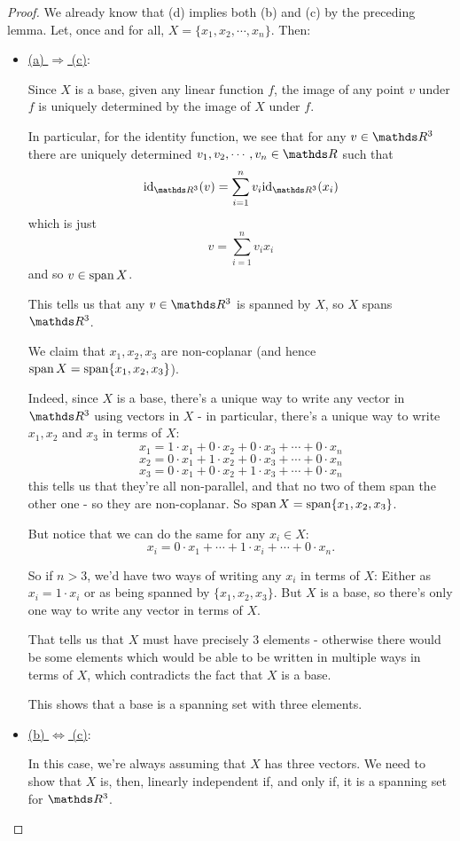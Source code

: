 \begin{proof}
	We already know that (d) implies both (b) and (c) by the preceding lemma. Let, once and for all, $X=\{x_1,x_2,\cdots,x_n\}$. Then:
	\begin{itemize}
		\item \underline{(a) $\Rightarrow$ (c)}:
		
		Since $X$ is a base, given any linear function $f$, the image of any point $v$ under $f$ is uniquely determined by the image of $X$ under $f$.
		
		In particular, for the identity function, we see that for any $v\in\R^3$ there are uniquely determined $v_1,v_2,\cdots,v_n\in\R$ such that
		\[\id_{\R^3}(v)=\sum_{i=1}^nv_i\id_{\R^3}(x_i)\]which is just
		\[v=\sum_{i=1}^nv_ix_i\]and so $v\in \operatorname{span} X$.
		
		This tells us that any $v\in\R^3$ is spanned by $X$, so $X$ spans $\R^3$.
		
		We claim that $x_1,x_2,x_3$ are non-coplanar (and hence $\operatorname{span} X=\operatorname{span} \{x_1,x_2,x_3\}$).
		
		Indeed, since $X$ is a base, there's a unique way to write any vector in $\R^3$ using vectors in $X$ - in particular, there's a unique way to write $x_1,x_2$ and $x_3$ in terms of $X$:
		\[x_1=1\cdot x_1+0\cdot x_2+0\cdot x_3+\cdots+0\cdot x_n\]
		\[x_2=0\cdot x_1+1\cdot x_2+0\cdot x_3+\cdots+0\cdot x_n\]
		\[x_3=0\cdot x_1+0\cdot x_2+1\cdot x_3+\cdots+0\cdot x_n\]this tells us that they're all non-parallel, and that no two of them span the other one - so they are non-coplanar. So $\operatorname{span} X=\operatorname{span} \{x_1,x_2,x_3\}$.
		
		But notice that we can do the same for any $x_i\in X$:
		\[x_i=0\cdot x_1+\cdots+1\cdot x_i+\cdots+0\cdot x_n.\]
		
		So if $n>3$, we'd have two ways of writing any $x_i$ in terms of $X$: Either as $x_i=1\cdot x_i$ or as being spanned by $\{x_1,x_2,x_3\}$. But $X$ is a base, so there's only one way to write any vector in terms of $X$.
		
		That tells us that $X$ must have precisely $3$ elements - otherwise there would be some elements which would be able to be written in multiple ways in terms of $X$, which contradicts the fact that $X$ is a base.
		
		This shows that a base is a spanning set with three elements.
		
		\item \underline{(b) $\iff$ (c)}:
		
		In this case, we're always assuming that $X$ has three vectors. We need to show that $X$ is, then, linearly independent if, and only if, it is a spanning set for $\R^3$.
		

\end{itemize}
\end{proof}
